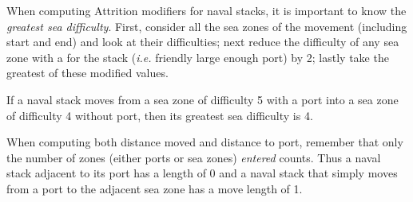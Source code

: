 When computing Attrition modifiers for naval stacks, it is important to know
the \emph{greatest sea difficulty}. First, consider all the sea zones of the
movement (including start and end) and look at their difficulties; next reduce
the difficulty of any sea zone with a \SoS for the stack (\emph{i.e.} friendly
large enough port) by 2; lastly take the greatest of these modified values.

\begin{exemple}
  If a naval stack moves from a sea zone of difficulty 5 with a port into a
  sea zone of difficulty 4 without port, then its greatest sea difficulty is
  4.
\end{exemple}

When computing both distance moved and distance to port, remember that only
the number of zones (either ports or sea zones) \emph{entered} counts. Thus a
naval stack adjacent to its port has a \LoS length of 0 and a naval stack that
simply moves from a port to the adjacent sea zone has a move length of 1.

